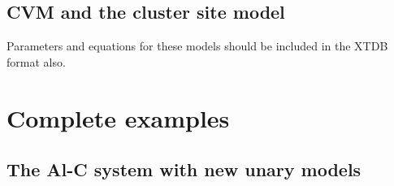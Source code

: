 \documentclass{article}
\begin{document}
\begin{appendices}
\subsection{CVM and the cluster site model}

Parameters and equations for these models should be included in the
XTDB format also.

\newpage

\setcounter{equation}{0}
\renewcommand{\theequation}{D\arabic{equation}}
\setcounter{figure}{0}
\renewcommand{\thefigure}{D\arabic{figure}}

\section{Complete examples}\label{sec:complete}

\subsection{The Al-C system with new unary models}\label{sec:alc}


\end{appendices}
\end{document}
